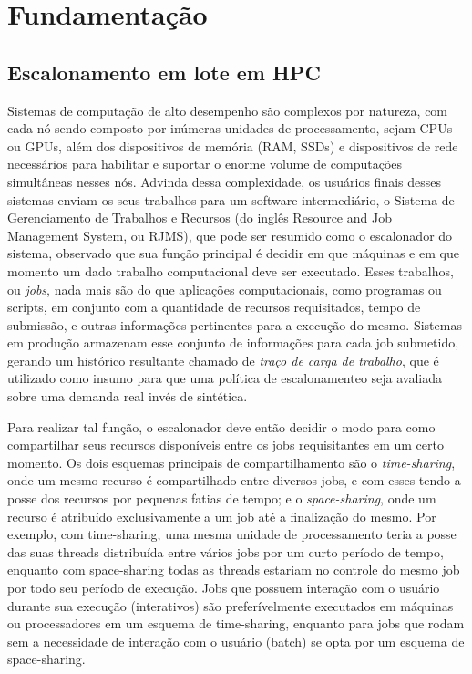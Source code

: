 
\chapter{Fundamentação}

\section{Escalonamento em lote em HPC}
\label{sec:escalonamento}

Sistemas de computação de alto desempenho são complexos por natureza, com cada nó sendo composto
por inúmeras unidades de processamento, sejam CPUs ou GPUs, além dos dispositivos de memória (RAM, SSDs)
e dispositivos de rede necessários para habilitar e suportar o enorme volume de computações simultâneas
nesses nós. Advinda dessa complexidade, os usuários finais desses sistemas enviam os seus trabalhos para
um software intermediário, o Sistema de Gerenciamento de Trabalhos e Recursos (do inglês Resource and Job
Management System, ou RJMS), que pode ser resumido como o escalonador do sistema, observado que sua função
principal é decidir em que máquinas e em que momento um dado trabalho computacional deve ser executado. 
Esses trabalhos, ou \emph{jobs}, nada mais são do que aplicações computacionais, como programas ou scripts,
em conjunto com a quantidade de recursos requisitados, tempo de submissão, e outras informações pertinentes
para a execução do mesmo. Sistemas em produção armazenam esse conjunto de informações para cada job submetido,
gerando um histórico resultante chamado de \emph{traço de carga de trabalho}, que é utilizado como 
insumo para que uma política de escalonamenteo seja avaliada sobre uma demanda real invés de sintética.

Para realizar tal função, o escalonador deve então decidir o modo para como compartilhar seus recursos disponíveis
entre os jobs requisitantes em um certo momento. Os dois esquemas principais de compartilhamento são o \emph{time-sharing},
onde um mesmo recurso é compartilhado entre diversos jobs, e com esses tendo a posse dos recursos por 
pequenas fatias de tempo; e o \emph{space-sharing}, onde um recurso é atribuído exclusivamente a um job até a finalização do mesmo. 
Por exemplo, com time-sharing, uma mesma unidade de processamento teria a posse das suas 
threads distribuída entre vários jobs por um curto período de tempo, enquanto com space-sharing
todas as threads estariam no controle do mesmo job por todo seu período de execução. Jobs que possuem
interação com o usuário durante sua execução (interativos) são preferívelmente executados em máquinas ou
processadores em um esquema de time-sharing, enquanto para jobs que rodam sem a necessidade de interação com 
o usuário (batch) se opta por um esquema de space-sharing.

